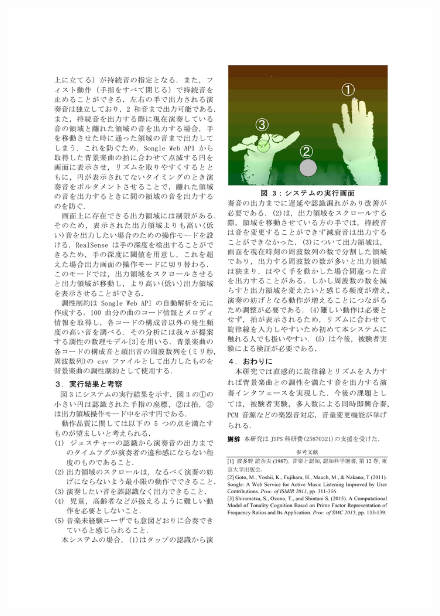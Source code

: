 \begin{figure}[ht]
    \begin{center}
        \includegraphics[width=1.0\linewidth]{part/B.IPSJ2015/ichinose160105_2.pdf}
    \end{center}
\end{figure}

\clearpage
